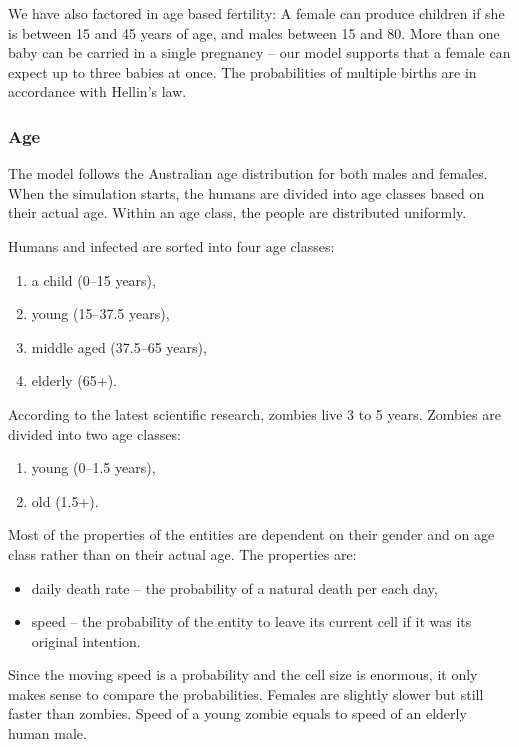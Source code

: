 \documentclass[a4paper]{article}
\begin{document}
We have also factored in age based fertility: A female can produce children if she is between 15 and 45 years of age, and males between 15 and 80.
More than one baby can be carried in a single pregnancy -- our model supports that a female can expect up to three babies at once.
The probabilities of multiple births are in accordance with Hellin's law. \cite{hellinslaw}

\subsubsection{Age}

The model follows the Australian age distribution for both males and females.
When the simulation starts, the humans are divided into age classes based on their actual age.
Within an age class, the people are distributed uniformly.

Humans and infected are sorted into four age classes:
\begin{enumerate}
\item a child (0--15 years),
\item young (15--37.5 years),
\item middle aged (37.5--65 years),
\item elderly (65+).
\end{enumerate}

According to the latest scientific research, zombies live 3 to 5 years. \cite{zombiepedia}
Zombies are divided into two age classes:
\begin{enumerate}
\item young (0--1.5 years),
\item old (1.5+).
\end{enumerate}

Most of the properties of the entities are dependent on their gender and on age class rather than on their actual age.
The properties are:
\begin{itemize}
\item daily death rate -- the probability of a natural death per each day,
\item speed -- the probability of the entity to leave its current cell if it was its original intention.
\end{itemize}

Since the moving speed is a probability and the cell size is enormous, it only makes sense to compare the probabilities.
Females are slightly slower but still faster than zombies.
Speed of a young zombie equals to speed of an elderly human male.
\end{document}
